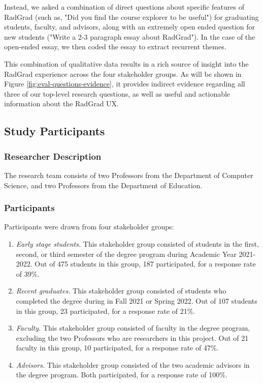 \documentclass[acmsmall,nonacm]{acmart}
\begin{document}
Instead, we asked a combination of direct questions about specific features of RadGrad (such as, "Did you find the course explorer to be useful") for graduating students, faculty, and advisors, along with an extremely open ended question for new students ("Write a 2-3 paragraph essay about RadGrad").  In the case of the open-ended essay, we then coded the essay to extract recurrent themes.

This combination of qualitative data results in a rich source of insight into the RadGrad experience across the four stakeholder groups. As will be shown in Figure \ref{fig:eval-questions-evidence}, it provides indirect evidence regarding all three of our top-level research questions, as well as useful and actionable information about the RadGrad UX.

\subsection{Study Participants}

\subsubsection{Researcher Description}

The research team consists of two Professors from the Department of Computer Science, and two Professors from the Department of Education.

\subsubsection{Participants}

Participants were drawn from four stakeholder groups:

\begin{enumerate}
\item {\em Early stage students.}  This stakeholder group consisted of students in the first, second, or third semester of the degree program during Academic Year 2021-2022.  Out of 475 students in this group, 187 participated, for a response rate of 39\%.

\item {\em Recent graduates.}  This stakeholder group consisted of students who completed the degree during in Fall 2021 or Spring 2022. Out of 107 students in this group, 23 participated, for a response rate of 21\%.

\item {\em Faculty.} This stakeholder group consisted of faculty in the degree program, excluding the two Professors who are researchers in this project.  Out of 21 faculty in this group, 10 participated, for a response rate of 47\%.

\item {\em Advisors.} This stakeholder group consisted of the two academic advisors in the degree program.  Both participated, for a response rate of 100\%.

\end{enumerate}
\end{document}
